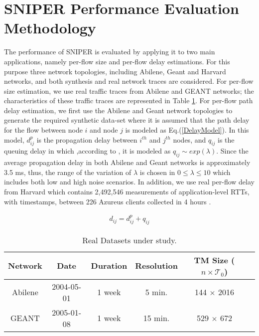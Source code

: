 \section{SNIPER Performance Evaluation Methodology}  \label{sec:SNIPERPerfEvalApp}
The performance of SNIPER is evaluated by applying it to two main applications, namely per-flow size and per-flow delay estimations. For this purpose three network topologies, including Abilene, Geant and Harvard networks, and both synthesis and real network traces are considered. For per-flow size estimation, we use real traffic traces from Abilene \cite{Abilene} and GEANT \cite{Uhlig:2006} networks; the characteristics of these traffic traces are represented in Table \ref{tab:DataSetProp}. For per-flow path delay estimation, we first use the Abilene and Geant network topologies to generate the required synthetic data-set where it is assumed that the path delay for the flow between node $i$ and node $j$ is modeled as Eq.(\ref{DelayModel}). In this model, $d^{p}_{ij}$ is the propagation delay between $i^{th}$ and $j^{th}$ nodes, and $q_{ij}$ is the queuing delay in which ,according to \cite{Pietro:2008}, it is modeled as $q_{ij} \sim exp(\lambda)$. Since the average propagation delay in both Abilene and Geant networks is approximately 3.5 ms, thus, the range of the variation of $\lambda$ is chosen in $0 \leq \lambda \leq 10$ which includes both low and high noise scenarios. In addition, we use real per-flow delay from Harvard \cite{JLedlie:2007} which contains 2,492,546 measurements of application-level RTTs, with timestamps, between 226 Azureus clients collected in 4 hours \cite{YLiao:2011}.

\begin{equation} \label{DelayModel}
\begin{aligned}
d_{ij}=d^{p}_{ij}+q_{ij}
\end{aligned}
\end{equation}

\begin{table}[b]
	\centering
		\begin{tabular}{| c | c | c | c | c | c |}
		\hline
     Network  & Date       & Duration  & Resolution   & TM Size ($n \times \mathcal{T}_{0}$)              \\ \hline
    \hline
      Abilene \cite{Abilene}   & 2004-05-01 &  1 week   &  5 min. & 144 $\times$ 2016    \\ \hline
      GEANT \cite{Uhlig:2006}  & 2005-01-08 &  1 week   & 15 min. & 529 $\times$ 672     \\ \hline
    \end{tabular}
		\vspace{0.15cm}
	\caption{Real Datasets under study.}
	\label{tab:DataSetProp}
\end{table}

